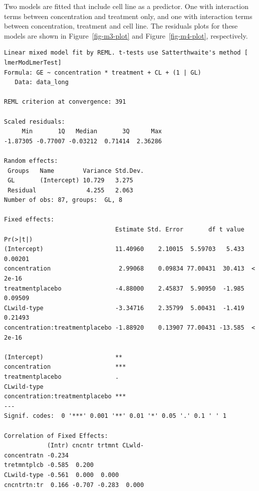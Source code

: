 \documentclass[
  letterpaper,
  DIV=11,
  numbers=noendperiod]{scrartcl}
\begin{document}
Two models are fitted that include cell line as a predictor. One with
interaction terms between concentration and treatment only, and one with
interaction terms between concentration, treatment and cell line. The
residuals plots for these models are shown in Figure~\ref{fig-m3-plot}
and Figure~\ref{fig-m4-plot}, respectively.

\begin{verbatim}
Linear mixed model fit by REML. t-tests use Satterthwaite's method [
lmerModLmerTest]
Formula: GE ~ concentration * treatment + CL + (1 | GL)
   Data: data_long

REML criterion at convergence: 391

Scaled residuals: 
     Min       1Q   Median       3Q      Max 
-1.87305 -0.77007 -0.03212  0.71414  2.36286 

Random effects:
 Groups   Name        Variance Std.Dev.
 GL       (Intercept) 10.729   3.275   
 Residual              4.255   2.063   
Number of obs: 87, groups:  GL, 8

Fixed effects:
                               Estimate Std. Error       df t value Pr(>|t|)
(Intercept)                    11.40960    2.10015  5.59703   5.433  0.00201
concentration                   2.99068    0.09834 77.00431  30.413  < 2e-16
treatmentplacebo               -4.88000    2.45837  5.90950  -1.985  0.09509
CLwild-type                    -3.34716    2.35799  5.00431  -1.419  0.21493
concentration:treatmentplacebo -1.88920    0.13907 77.00431 -13.585  < 2e-16
                                  
(Intercept)                    ** 
concentration                  ***
treatmentplacebo               .  
CLwild-type                       
concentration:treatmentplacebo ***
---
Signif. codes:  0 '***' 0.001 '**' 0.01 '*' 0.05 '.' 0.1 ' ' 1

Correlation of Fixed Effects:
            (Intr) cncntr trtmnt CLwld-
concentratn -0.234                     
tretmntplcb -0.585  0.200              
CLwild-type -0.561  0.000  0.000       
cncntrtn:tr  0.166 -0.707 -0.283  0.000
\end{verbatim}
\end{document}

